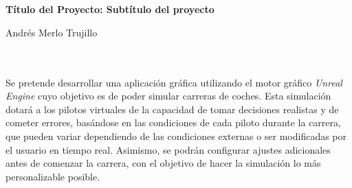 \chapter*{}






\cleardoublepage
\thispagestyle{empty}

\begin{center}
{\large\bfseries Título del Proyecto: Subtítulo del proyecto}\\
\end{center}
\begin{center}
Andrés Merlo Trujillo\\
\end{center}

\\

\vspace{0.7cm}
\\


Se pretende desarrollar una aplicación gráfica utilizando el motor gráfico \textit{Unreal Engine} cuyo objetivo es de poder simular carreras de coches. Esta simulación dotará a los pilotos virtuales de la capacidad de tomar decisiones realistas y de cometer errores, basándose en las condiciones de cada piloto durante la carrera, que pueden variar dependiendo de las condiciones externas o ser modificadas por el usuario en tiempo real. Asimismo, se podrán configurar ajustes adicionales antes de comenzar la carrera, con el objetivo de hacer la simulación lo más personalizable posible.

